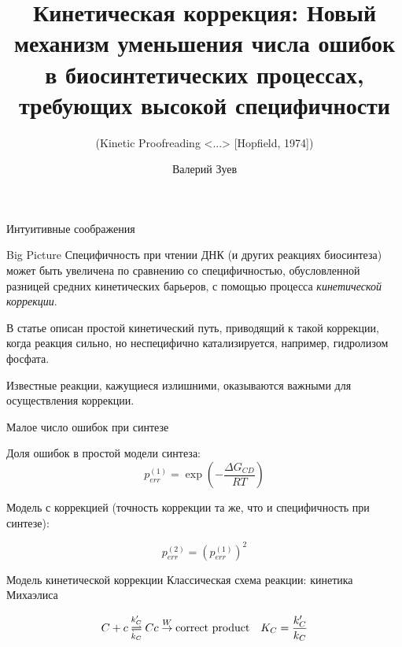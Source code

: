 \documentclass{beamer}
\title{Кинетическая коррекция: Новый механизм уменьшения числа ошибок в биосинтетических процессах, требующих высокой специфичности}
\subtitle{(Kinetic Proofreading <...> [Hopfield, 1974])}
\author{Валерий Зуев}
\begin{document}
\begin{frame}[plain]
    \maketitle
\end{frame}
\begin{frame}{Интуитивные соображения}

\end{frame}
\begin{frame}{Big Picture}
Специфичность при чтении ДНК (и других реакциях биосинтеза) может быть увеличена по сравнению со специфичностью, обусловленной разницей средних кинетических барьеров, с помощью процесса \emph{кинетической коррекции}.

В статье описан простой кинетический путь, приводящий к такой коррекции, когда реакция сильно, но неспецифично катализируется, например, гидролизом фосфата.

Известные реакции, кажущиеся излишними, оказываются важными для осуществления коррекции.

\end{frame}

\begin{frame}{Малое число ошибок при синтезе}

Доля ошибок в простой модели синтеза:
\[ p_{err}^{(1)} = \exp \left( - \frac{\Delta G_{CD}}{RT} \right) \]

Модель с коррекцией (точность коррекции та же, что и специфичность при синтезе):

\[ p_{err}^{(2)} = \left(p_{err}^{(1)}\right)^2 \]


\end{frame}

\begin{frame}{Модель кинетической коррекции}
Классическая схема реакции: кинетика Михаэлиса

\[ C + c \overunderset{k'_C}{k_C}{\rightleftharpoons} Cc \overset{W}\to \text{correct product} \quad K_C = \frac{k'_C}{k_C} \]

\end{frame}
\end{document}
